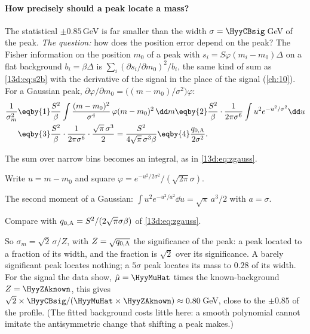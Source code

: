 \paragraph{How precisely should a peak locate a mass?}
The statistical $\pm0.85\,$GeV is far smaller than the width $\sigma=\HyyCBsig\,$GeV of the
peak. \emph{The question:} how does the position error depend on the peak? The Fisher
information on the position $m_0$ of a peak with $s_i=S\varphi(m_i-m_0)\Delta$ on a flat
background $b_i=\beta\Delta$ is $\sum_i(\partial s_i/\partial m_0)^2/b_i$, the same kind of
sum as \eqref{13d:eq:s2b} with the derivative of the signal in the place of the signal
(\cref{ch:10}). For a Gaussian peak, $\partial\varphi/\partial m_0=\bigl((m-m_0)/\sigma^2\bigr)\varphi$:
\begin{align}
  \frac{1}{\sigma_m^2}
  &\eqby{1} \frac{S^2}{\beta}\int\frac{(m-m_0)^2}{\sigma^4}\,\varphi(m-m_0)^2\,\dd m
   \eqby{2} \frac{S^2}{\beta}\cdot\frac{1}{2\pi\sigma^6}\int u^2e^{-u^2/\sigma^2}\dd u
  \nonumber\\
  &\eqby{3} \frac{S^2}{\beta}\cdot\frac{1}{2\pi\sigma^6}\cdot\frac{\sqrt\pi\,\sigma^3}{2}
   = \frac{S^2}{4\sqrt\pi\,\sigma^3\beta}
   \eqby{4} \frac{q_{0,\rm A}}{2\sigma^2} .
  \label{13d:eq:sigma-m}
\end{align}
\begin{explain}
  \item The sum over narrow bins becomes an integral, as in \eqref{13d:eq:zgauss}.
  \item Write $u=m-m_0$ and square
        $\varphi=e^{-u^2/2\sigma^2}/(\sqrt{2\pi}\sigma)$.
  \item The second moment of a Gaussian: $\int u^2e^{-u^2/a^2}\dd u=\sqrt\pi\,a^3/2$ with
        $a=\sigma$.
  \item Compare with $q_{0,\rm A}=S^2/(2\sqrt\pi\sigma\beta)$ of \eqref{13d:eq:zgauss}.
\end{explain}
So $\sigma_m=\sqrt2\,\sigma/Z$, with $Z=\sqrt{q_{0,\rm A}}$ the significance of the peak: a
peak located to a fraction of its width, and the fraction is $\sqrt2$ over its
significance. A barely significant peak locates nothing; a $5\sigma$ peak locates its mass
to $0.28$ of its width. For the signal the data show, $\hat\mu=\HyyMuHat$ times the
known-background $Z=\HyyZAknown$, this gives
$\sqrt2\times\HyyCBsig/(\HyyMuHat\times\HyyZAknown)\approx0.80\,$GeV, close to the
$\pm0.85$ of the profile. (The fitted background costs little here: a smooth polynomial
cannot imitate the antisymmetric change that shifting a peak makes.)

